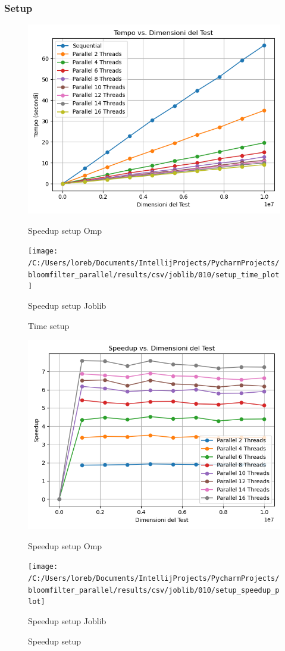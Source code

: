 \documentclass[11pt]{article}
\begin{document}
    \subsubsection{Setup}\label{subsubsec:fpr-010-setup}
    \begin{figure}[H]
        \centering
        \includegraphics[width=\linewidth]{omp/010/setup_time_plot}
            \caption{Speedup setup Omp}\label{fig:010-setup_time_omp}
        \endminipage\hfill
        \texttt{[image: /C:/Users/loreb/Documents/IntellijProjects/PycharmProjects/bloomfilter\_parallel/results/csv/joblib/010/setup\_time\_plot]}
            \caption{Speedup setup Joblib}\label{fig:010setup_time_joblib}
        \endminipage\hfill
        \caption{Time setup}
    \end{figure}
    \begin{figure}[H]
        \centering
        \includegraphics[width=\linewidth]{omp/010/setup_speedup_plot}
            \caption{Speedup setup Omp}\label{fig:010-setup_speedup_omp}
        \endminipage\hfill
        \texttt{[image: /C:/Users/loreb/Documents/IntellijProjects/PycharmProjects/bloomfilter\_parallel/results/csv/joblib/010/setup\_speedup\_plot]}
            \caption{Speedup setup Joblib}\label{fig:010-setup_speedup_joblib}
        \endminipage\hfill
        \caption{Speedup setup}
    \end{figure}
\end{document}
